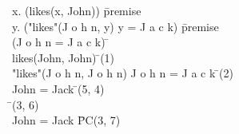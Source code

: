 \documentclass{article}
\begin{document}
\begin{proofbox}
\: \forall x. (likes(x, John)) \= \hbox{premise} \\
\: \forall y. ("likes"(J o h n, y) \rightarrow y = J a c k) \= \hbox{premise} \\
\open
\: \lnot (J o h n = J a c k) \= \asm \\
\: likes(John, John) \= \forallelim(1) \\
\: "likes"(J o h n, J o h n) \rightarrow J o h n = J a c k \= \forallelim(2) \\
\: John = Jack \= \implieselim(5, 4) \\
\: \bot \= \notelim(3, 6) \\
\close
\: John = Jack \= PC(3, 7) \\
\end{proofbox}
\end{document}
